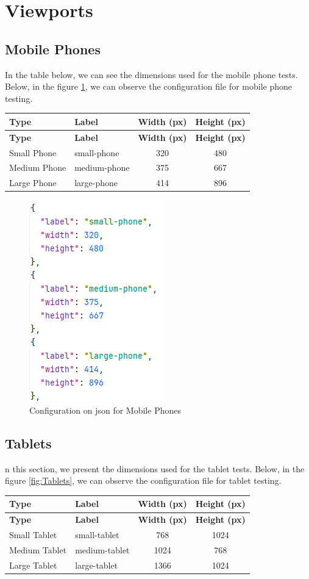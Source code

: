 \documentclass[a4paper,11pt,openright,BCOR=15mm]{scrbook}
\begin{document}
\section{Viewports}
\subsection{Mobile Phones}
In the table below, we can see the dimensions used for the mobile phone tests. Below, in the figure \ref{fig:Mobile Phones}, we can observe the configuration file for mobile phone testing.

\begin{longtable}{|l|l|c|c|}
\hline
\textbf{Type} & \textbf{Label} & \textbf{Width (px)} & \textbf{Height (px)} \\
\hline
\endfirsthead
\hline
\textbf{Type} & \textbf{Label} & \textbf{Width (px)} & \textbf{Height (px)} \\
\hline
\endhead
Small Phone & small-phone & 320 & 480 \\
Medium Phone & medium-phone & 375 & 667 \\
Large Phone & large-phone & 414 & 896 \\
\hline
\end{longtable}

\begin{figure}[H]
	\centering
	\includegraphics[width=.3\textwidth]{figs/Visual compatibility/Phone.png}
	\caption{Configuration on json for Mobile Phones}
	\label{fig:Mobile Phones}
\end{figure}

\subsection{Tablets}
n this section, we present the dimensions used for the tablet tests. Below, in the figure \ref{fig:Tablets}, we can observe the configuration file for tablet testing.
\begin{longtable}{|l|l|c|c|}
\hline
\textbf{Type} & \textbf{Label} & \textbf{Width (px)} & \textbf{Height (px)} \\
\hline
\endfirsthead
\hline
\textbf{Type} & \textbf{Label} & \textbf{Width (px)} & \textbf{Height (px)} \\
\hline
\endhead
Small Tablet & small-tablet & 768 & 1024 \\
Medium Tablet & medium-tablet & 1024 & 768 \\
Large Tablet & large-tablet & 1366 & 1024 \\
\hline
\end{longtable}
\end{document}
